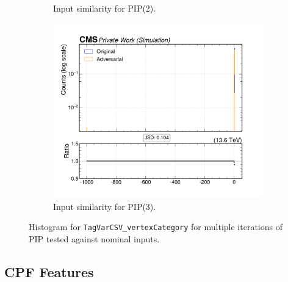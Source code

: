 \begin{figure}[htbp]
\begin{subfigure}[t]{0.32\textwidth}
    \caption{Input similarity for PIP(2).}
  \end{subfigure}\hfill
  \begin{subfigure}[t]{0.32\textwidth}
    \includegraphics[width=\linewidth]{media/output/features/compare/intprob_3/cmp_global_features_TagVarCSV_vertexCategory.pdf}
    \caption{Input similarity for PIP(3).}
  \end{subfigure}

  \caption{Histogram for \texttt{TagVarCSV\_vertexCategory} for multiple iterations of PIP tested against nominal inputs.}
  \label{fig:intprob_input_TagVarCSV_vertexCategory}
\end{figure}

\newpage
\subsection*{CPF Features}

